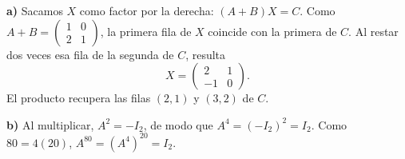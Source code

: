 \textbf{a)} Sacamos $X$ como factor por la derecha:
$(A+B)X=C$. Como $A+B=\begin{pmatrix}1&0\\2&1\end{pmatrix}$,
la primera fila de $X$ coincide con la primera de $C$.
Al restar dos veces esa fila de la segunda de $C$, resulta
\[
X=\boxed{\begin{pmatrix}2&1\\-1&0\end{pmatrix}}.
\]
El producto recupera las filas $(2,1)$ y $(3,2)$ de $C$.

\textbf{b)} Al multiplicar, $A^2=-I_2$, de modo que
$A^4=(-I_2)^2=\boxed{I_2}$. Como $80=4(20)$,
$A^{80}=(A^4)^{20}=\boxed{I_2}$.
